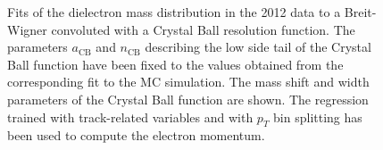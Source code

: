 \documentclass{cmspaper}
\begin{document}
\begin{figure}[h]
\centering
	\caption{Fits of the dielectron mass distribution in the 2012 data to
        a Breit-Wigner convoluted with a Crystal Ball resolution function. The parameters $a_{\mathrm{CB}}$ 
        and $n_{\mathrm{CB}}$ describing the low side tail of the Crystal Ball function have been fixed to the values
        obtained from the corresponding fit to the MC simulation. The mass shift and width parameters 
        of the Crystal Ball function are shown. The regression trained with track-related variables
        and with $p_{T}$ bin splitting has been used to compute the electron momentum.}
	\label{fig:ZMassFit_2012Data_Regression4}
\end{figure}

\clearpage
\end{document}
